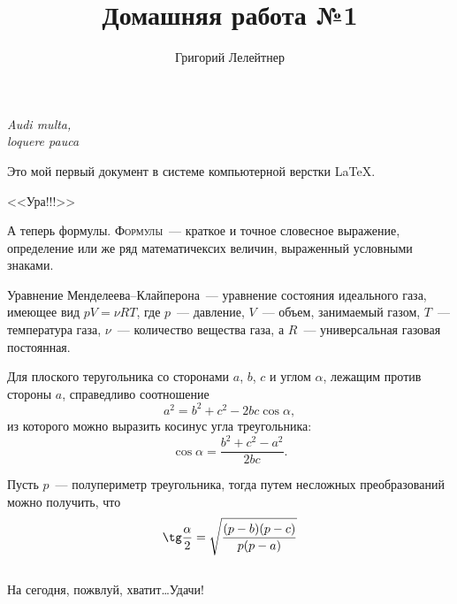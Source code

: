 \documentclass[12pt]{article}
\title{Домашняя работа №1}
\author{Григорий Лелейтнер}
\date{}
\begin{document}
    \maketitle
    
    \begin{flushright}
    {\itshape
        Audi multa,\\
        loquere pauca
    }
    \end{flushright}
    \vspace{20pt}
    
    Это мой первый документ в системе компьютерной верстки \LaTeX.
    
    \begin{center}
        {\Huge \sffamily <<Ура!!!>> }
    \end{center}
    
    А теперь формулы. \textsc{Формулы}~--- краткое и точное словесное выражение, определение или же ряд математичексих величин, выраженный условными знаками.
    
    \vspace{15pt}
    \hspace{14pt}{\Large \bfseries Термодинамика}
    
    Уравнение Менделеева--Клайперона~--- уравнение состояния идеального газа, имеющее вид $pV = \nu RT$, где $p$~--- давление, $V$~--- объем, занимаемый газом, $T$~--- температура газа, $\nu$~--- количество вещества газа, а $R$~--- универсальная газовая постоянная.
    
    \vspace{15pt}
    \hspace{14pt}{\Large \bfseries Геометрия \hfill Планиметрия}
    
    Для плоского теругольника со сторонами $a$, $b$, $c$ и углом $\alpha$, лежащим против стороны $a$, справедливо соотношение
    $$a^2 = b^2 + c^2 - 2bc\cos\alpha,$$
    из которого можно выразить косинус угла треугольника:
    $$\cos\alpha = \frac{b^2 + c^2 - a^2}{2bc}.$$
    
    Пусть $p$~--- полупериметр треугольника, тогда путем несложных преобразований можно получить, что 
    $$\tg \frac{\alpha}{2} = \sqrt{\frac{(p-b)(p-c)}{p(p-a)}}$$\\
    \vspace{1cm}
    На сегодня, пожвлуй, хватит\dots Удачи!
    
\end{document}
